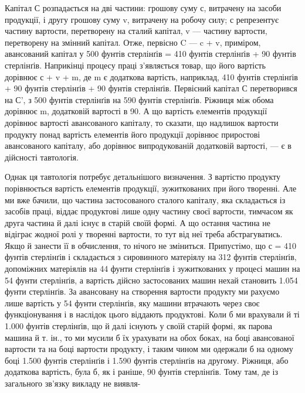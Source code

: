 Капітал С розпадається на дві частини: грошову суму с, витрачену на засоби продукції, і другу
грошову суму v, витрачену на робочу силу; с репрезентує частину вартости, перетворену на сталий
капітал, v — частину вартости, перетворену на змінний капітал. Отже, первісно C — c + v, приміром,
авансований капітал у 500 фунтів стерлінґів = 410 фунтів стерлінґів + 90 фунтів стерлінґів.
Наприкінці процесу праці з’являється товар, що його вартість дорівнює с + v + m, де m є додаткова
вартість, наприклад, 410 фунтів стерлінґів + 90 фунтів стерлінґів + 90 фунтів стерлінґів. Первісний
капітал С перетворився на С',
з 500 фунтів стерлінґів на 590 фунтів стерлінґів. Ріжниця між обома дорівнює m, додатковій вартості
в 90. А що вартість елементів продукції дорівнює вартості авансованого капіталу, то сказати, що
надлишок вартости продукту понад вартість елементів його продукції дорівнює приростові авансованого
капіталу, або дорівнює випродукованій додатковій вартості, — є в дійсності тавтологія.

Однак ця тавтологія потребує детальнішого визначення. З вартістю продукту порівнюється вартість
елементів продукції, зужиткованих при його творенні. Але ми вже бачили, що частина застосованого
сталого капіталу, яка складається із засобів праці, віддає продуктові лише одну частину своєї
вартости, тимчасом як друга частина й далі існує в старій своїй формі. А що остання частина не
відіграє жодної ролі у творенні вартости, то тут від неї треба абстрагуватись. Якщо й занести її в
обчислення, то нічого не зміниться. Припустімо, що с = 410 фунтів стерлінґів і
складається з сировинного матеріялу на 312 фунтів стерлінґів, допоміжних матеріялів на 44 фунти
стерлінґів і зужиткованих
у процесі машин на 54 фунти стерлінґів, а вартість дійсно застосованих машин нехай становить 1.054
фунти стерлінґів. За авансовану на створення вартости продукту ми рахуємо лише вартість у 54 фунти
стерлінґів, яку машини втрачають через своє функціонування і в наслідок цього віддають продуктові.
Коли б ми врахували
й ті 1.000 фунтів стерлінґів, що й далі існують у своїй старій формі, як парова машина й т. ін., то
ми мусили б їх урахувати
на обох боках, на боці авансованої вартости та на боці вартости продукту, і таким чином ми
одержали б на одному боці
1.500 фунтів стерлінґів і 1.590 фунтів стерлінґів на другому. Ріжниця, або додаткова вартість, була
б, як і раніше, 90 фунтів стерлінґів. Тому там, де із загального зв’язку викладу не виявля-